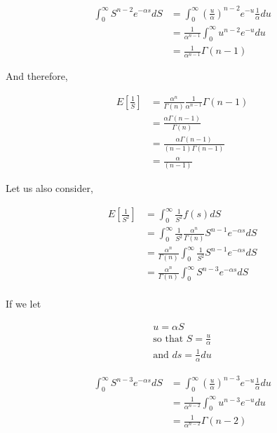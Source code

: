 \documentclass[]{article}
\begin{document}
\begin{align*}
	\int_{0}^{\infty} S^{n-2} e^{-\alpha s} dS  &= \int_{0}^{\infty} \left(\frac{u}{\alpha} \right)^{n-2} e^{-u}\frac{1}{\alpha} du \\
												&= \frac{1}{\alpha^{n-1}} \int_{0}^{\infty} u^{n-2} e^{-u} du \\
												&= \frac{1}{\alpha^{n-1}} \Gamma(n-1)
\end{align*}

\noindent And therefore, 

\begin{align*}
E \left[\frac{1}{S}\right] &= \frac{\alpha^n}{\Gamma (n)} \frac{1}{\alpha^{n-1}} \Gamma(n-1)\\
							&=  \frac{\alpha\Gamma (n-1)}{\Gamma (n)}\\
							&=  \frac{\alpha\Gamma (n-1)}{(n-1)\Gamma (n-1)}\\
							&=  \frac{\alpha}{(n-1)}
\end{align*}



\noindent Let us also consider,

\begin{align*}
	E \left[\frac{1}{S^2}\right] &= \int_{0}^{\infty} \frac{1}{S^2} f(s) dS\\
	&= \int_{0}^{\infty} \frac{1}{S^2}  \frac{\alpha^n}{\Gamma (n)} S^{n-1} e^{-\alpha s} dS \\
	&= \frac{\alpha^n}{\Gamma (n)} \int_{0}^{\infty} \frac{1}{S^2} S^{n-1} e^{-\alpha s} dS \\
	&= \frac{\alpha^n}{\Gamma (n)} \int_{0}^{\infty} S^{n-3} e^{-\alpha s} dS \\
\end{align*}

\noindent If we let

\begin{align*}
	u = \alpha S\\
	\text{so that } S=\frac{u}{\alpha}\\
	\text{and } ds = \frac{1}{\alpha} du
\end{align*}

\begin{align*}
	\int_{0}^{\infty} S^{n-3} e^{-\alpha s} dS  &= \int_{0}^{\infty} \left(\frac{u}{\alpha} \right)^{n-3} e^{-u} \frac{1}{\alpha} du \\
										&= \frac{1}{\alpha^{n-2}} \int_{0}^{\infty} u^{n-3} e^{-u} du \\
										&= \frac{1}{\alpha^{n-2}} \Gamma(n-2)
\end{align*}
\end{document}
